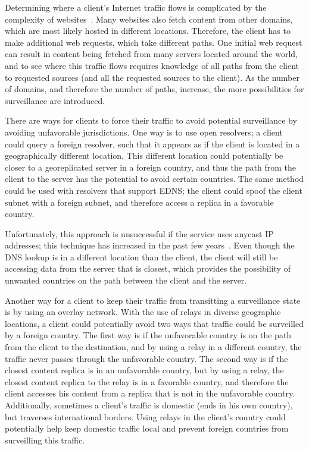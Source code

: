 Determining where a client's Internet traffic flows is complicated by
the complexity of websites~\cite{butkiewicz2011understanding}.  Many
websites also fetch content from other domains, which are most likely
hosted in different locations.  Therefore, the client has to make
additional web requests, which take different paths.  One initial web
request can result in content being fetched from many servers located
around the world, and to see where this traffic flows requires knowledge
of all paths from the client to requested sources (and all the requested
sources to the client).  As the number of domains, and therefore the
number of paths, increase, the more possibilities for surveillance are
introduced. 

There are ways for clients to force their traffic to avoid potential
surveillance by avoiding unfavorable jurisdictions.  One way is to use
open resolvers; a client could query a foreign resolver, such that it
appears as if the client is located in a geographically different
location.  This different location could potentially be closer to a
georeplicated server in a foreign country, and thus the path from the
client to the server has the potential to avoid certain countries.  The
same method could be used with resolvers that support EDNS; the client
could spoof the client subnet with a foreign subnet, and therefore
access a replica in a favorable country. 

Unfortunately, this approach is unsuccessful if the service uses anycast
IP addresses; this technique has increased in the past few
years~\cite{cicalese2015characterizing}.  Even though the DNS lookup is
in a different location than the client, the client will still be
accessing data from the server that is closest, which provides the
possibility of unwanted countries on the path between the client and the
server.   

Another way for a client to keep their traffic from transitting a
surveillance state is by using an overlay network.  With the use of
relays in diverse geographic locations, a client could potentially avoid
two ways that traffic could be surveilled by a foreign country.  The
first way is if the unfavorable country is on the path from the client
to the destination, and by using a relay in a different country, the
traffic never passes through the unfavorable country.  The second way is
if the closest content replica is in an unfavorable country, but by
using a relay, the closest content replica to the relay is in a
favorable country, and therefore the client accesses his content from a
replica that is not in the unfavorable country.  Additionally, sometimes
a client's traffic is domestic (ends in his own country), but traverses
international borders.  Using relays in the client's country could
potentially help keep domestic traffic local and prevent foreign
countries from surveilling this traffic. 

